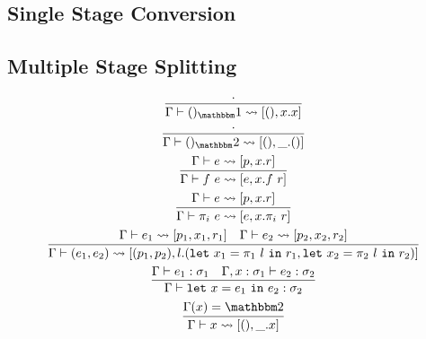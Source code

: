 \documentclass{article}
\newcommand {\bbone} {\mathbbm 1}
\newcommand {\bbtwo} {\mathbbm 2}
\newcommand {\letin} [3] {{\tt let}~{#1} = {#2}~{\tt in}~{#3}}
\newcommand {\splits} {\rightsquigarrow}
\begin{document}
\subsection {Single Stage Conversion}
\subsection {Multiple Stage Splitting}
\begin{gather}
\infer {\Gamma \vdash ()_\bbone \splits [(),x.x]}{\cdot} \\
\infer {\Gamma \vdash ()_\bbtwo \splits [(),\_.()]}{\cdot} \\
\infer {\Gamma \vdash f~e \splits [e,x.f~r]}{\Gamma \vdash e \splits [p,x.r]} \\
\infer {\Gamma \vdash \pi_i~e \splits [e,x.\pi_i~r]}{\Gamma \vdash e \splits [p,x.r]} \\
\infer {\Gamma \vdash (e_1,e_2) \splits [(p_1,p_2), l.(\letin{x_1}{\pi_1~l}{r_1},\letin{x_2}{\pi_2~l}{r_2})]}{\Gamma \vdash e_1 \splits [p_1,x_1,r_1] & \Gamma \vdash e_2 \splits [p_2,x_2,r_2]} \\
\infer {\Gamma\vdash \letin {x}{e_1}{e_2} : \sigma_2}{\Gamma\vdash e_1 : \sigma_1 & \Gamma,x:\sigma_1\vdash e_2 : \sigma_2} \\
\infer {\Gamma\vdash x \splits [(),\_.x]}{\Gamma(x) = \bbtwo} \\
\end{gather}
\end{document}

